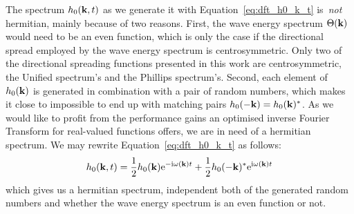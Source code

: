 

The spectrum $h_0(\mathbf{k},t)$ as we generate it with Equation~\ref{eq:dft_h0_k_t} is~\emph{not}
hermitian, mainly because of two reasons. First, the wave energy spectrum $\Theta(\mathbf{k})$ would need
to be an even function, which is only the case if the directional spread employed by
the wave energy spectrum is centrosymmetric. Only two of the directional spreading functions
presented in this work are centrosymmetric, the Unified spectrum's and the Phillips spectrum's.
Second, each element of $h_0(\mathbf{k})$ is generated in combination with a pair of random numbers,
which makes it close to impossible to end up with matching pairs $h_0(-\mathbf{k})=h_0(\mathbf{k})^*$.
As we would like to profit from the performance gains an optimised inverse Fourier Transform
for real-valued functions offers, we are in need of a hermitian spectrum. We may rewrite
Equation~\ref{eq:dft_h0_k_t} as follows:
%
\begin{equation}
\label{eq:dft_h0_k_t_hermitian}
 h_0(\mathbf{k}, t) =
 \frac{1}{2} h_0(\mathbf{k})\mathrm{e}^{-\mathrm{i}\omega(\mathbf{k})t}
 + \frac{1}{2} h_0(\mathbf{-k})^*\mathrm{e}^{\mathrm{i}\omega(\mathbf{k})t}
\end{equation}
%
which gives us a hermitian spectrum, independent both of the generated random numbers and 
whether the wave energy spectrum is an even function or not.


